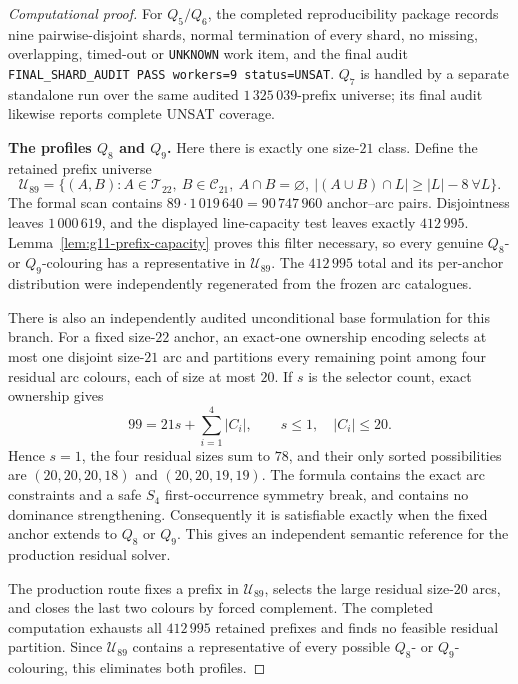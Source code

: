 \documentclass[11pt]{article}
\theoremstyle{definition}
\theoremstyle{remark}
\renewcommand{\ge}{\geqslant}
\renewcommand{\le}{\leqslant}
\begin{document}
\begin{proof}[Computational proof]
For \(Q_5/Q_6\), the completed reproducibility package records nine
pairwise-disjoint shards, normal termination of every shard, no missing,
overlapping, timed-out or \texttt{UNKNOWN} work item, and the final audit
\texttt{FINAL\_SHARD\_AUDIT PASS workers=9 status=UNSAT}.  \(Q_7\) is
handled by a separate standalone run over the same audited
\(1\,325\,039\)-prefix universe; its final audit likewise reports complete
UNSAT coverage.

\medskip\noindent\textbf{The profiles \(Q_8\) and \(Q_9\).}\quad
Here there is exactly one size-\(21\) class.  Define the retained prefix
universe
\[
\mathcal U_{89}=\bigl\{(A,B): A\in\mathcal T_{22},\ B\in\mathcal C_{21},
\ A\cap B=\varnothing,\ |(A\cup B)\cap L|\ge |L|-8\ \forall L\bigr\}.
\]
The formal scan contains \(89\cdot1\,019\,640=90\,747\,960\) anchor--arc
pairs.  Disjointness leaves \(1\,000\,619\), and the displayed line-capacity
test leaves exactly \(412\,995\).  Lemma~\ref{lem:g11-prefix-capacity}
proves this filter necessary, so every genuine \(Q_8\)- or \(Q_9\)-colouring
has a representative in \(\mathcal U_{89}\).  The \(412\,995\) total and its
per-anchor distribution were independently regenerated from the frozen arc
catalogues.

There is also an independently audited unconditional base formulation for
this branch.  For a fixed size-\(22\) anchor, an exact-one ownership encoding
selects at most one disjoint size-\(21\) arc and partitions every remaining
point among four residual arc colours, each of size at most \(20\).  If \(s\)
is the selector count, exact ownership gives
\[
  99=21s+\sum_{i=1}^4 |C_i|,
  \qquad s\le1,\quad |C_i|\le20.
\]
Hence \(s=1\), the four residual sizes sum to \(78\), and their only sorted
possibilities are \((20,20,20,18)\) and \((20,20,19,19)\).  The formula
contains the exact arc constraints and a safe \(S_4\) first-occurrence
symmetry break, and contains no dominance strengthening.  Consequently it is
satisfiable exactly when the fixed anchor extends to \(Q_8\) or \(Q_9\).
This gives an independent semantic reference for the production residual
solver.

The production route fixes a prefix in \(\mathcal U_{89}\), selects the
large residual size-\(20\) arcs, and closes the last two colours by forced
complement.  The completed computation exhausts all \(412\,995\) retained
prefixes and finds no feasible residual partition.  Since
\(\mathcal U_{89}\) contains a representative of every possible
\(Q_8\)- or \(Q_9\)-colouring, this eliminates both profiles.


\end{proof}
\end{document}
